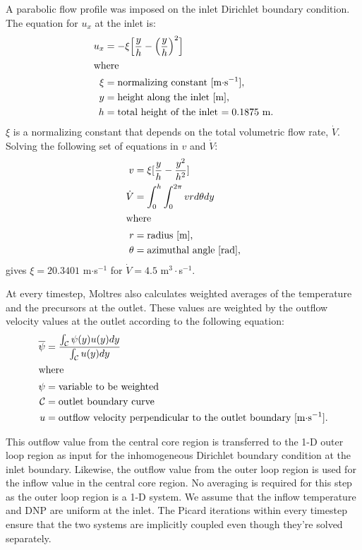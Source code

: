 A parabolic flow profile was imposed on the inlet Dirichlet boundary
condition. The equation for $u_x$ at the inlet is:
%
\begin{align}
    u_x &= -\xi \Big[\frac{y}{h} - \Big(\frac{y}{h}\Big)^2 
    \Big] \\
    \intertext{where}
    \xi &= \text{normalizing constant [m$\cdot$s$^{-1}$],} \nonumber \\
    y &= \text{height along the inlet [m],} \nonumber \\
    h &= \text{total height of the inlet $= 0.1875$ m.} \nonumber
\end{align}
%
$\xi$ is a normalizing constant that depends on the total volumetric flow
rate, $\dot{V}$. Solving the following set of equations in $v$ and $\dot{V}$:
%
\begin{align}
    v &= \xi [\frac{y}{h} - \frac{y^2}{h^2}] \\
    \dot{V} &= \int^h_0 \int^{2 \pi}_0 v r d\theta dy \\
    \intertext{where}
    r &= \text{radius [m],} \nonumber \\
    \theta &= \text{azimuthal angle [rad],} \nonumber
\end{align}
%
gives $\xi = 20.3401$ m$\cdot$s$^{-1}$ for $\dot{V} = 4.5$ m$^3\cdot$s$^{-1}$. 

At every timestep, Moltres also calculates weighted averages of the
temperature and the precursors at the outlet. These values are weighted by the
outflow velocity values at the outlet according to the following equation:
%
\begin{align}
    \overline{\psi} &= \frac{\int_\mathcal{C} \psi(y) u(y) dy}{
    \int_\mathcal{C} u(y) dy} \\
    \intertext{where}
    \psi &= \text{variable to be weighted} \nonumber \\
    \mathcal{C} &= \text{outlet boundary curve} \nonumber \\
    u &= \text{outflow velocity perpendicular to the outlet boundary
    [m$\cdot$s$^{-1}$].} \nonumber
\end{align}

This outflow value from the central core region is transferred to the 1-D
outer loop region as input for the inhomogeneous Dirichlet boundary
condition at the inlet boundary. Likewise, the outflow value from the outer
loop region is used for the inflow value in the central core region. No
averaging is required for this step as the outer loop region is a 1-D system.
We assume that the inflow temperature and \gls{DNP} are uniform at the inlet.
The Picard iterations within every timestep ensure that the two systems are
implicitly coupled even though they're solved separately.
